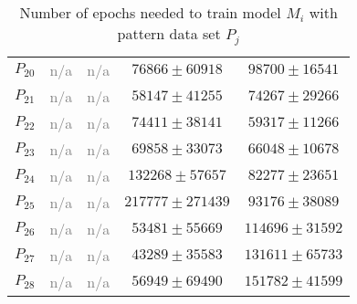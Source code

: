 \documentclass[12pt]{article}
\begin{document}
\begin{appendices}
\begin{table}[H]
\begin{tabular}{ccccc}
$P_{20}$  & \textcolor{gray}{n/a}  & \textcolor{gray}{n/a}  & $76866\pm60918$  & $98700\pm16541$ \\
$P_{21}$  & \textcolor{gray}{n/a}  & \textcolor{gray}{n/a}  & $58147\pm41255$  & $74267\pm29266$ \\
$P_{22}$  & \textcolor{gray}{n/a}  & \textcolor{gray}{n/a}  & $74411\pm38141$  & $59317\pm11266$ \\
$P_{23}$  & \textcolor{gray}{n/a}  & \textcolor{gray}{n/a}  & $69858\pm33073$  & $66048\pm10678$ \\
$P_{24}$  & \textcolor{gray}{n/a}  & \textcolor{gray}{n/a}  & $132268\pm57657$  & $82277\pm23651$ \\
$P_{25}$  & \textcolor{gray}{n/a}  & \textcolor{gray}{n/a}  & $217777\pm271439$  & $93176\pm38089$ \\
$P_{26}$  & \textcolor{gray}{n/a}  & \textcolor{gray}{n/a}  & $53481\pm55669$  & $114696\pm31592$ \\
$P_{27}$  & \textcolor{gray}{n/a}  & \textcolor{gray}{n/a}  & $43289\pm35583$  & $131611\pm65733$ \\
$P_{28}$  & \textcolor{gray}{n/a}  & \textcolor{gray}{n/a}  & $56949\pm69490$  & $151782\pm41599$ \\

    \end{tabular}
    \caption{Number of epochs needed to train model $M_i$ with pattern data set $P_j$}
    \end{table}
    


    \begin{table}[H]
    \centering
    \def\arraystretch{1.5}
    \footnotesize
    \begin{tabular}{ccccc}
    

\end{tabular}
\end{table}
\end{appendices}
\end{document}
